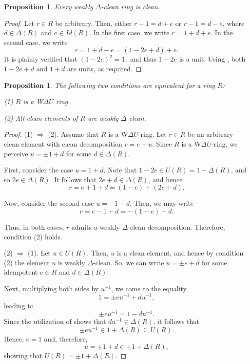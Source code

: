 \documentclass[12pt]{amsart}
\newtheorem{proposition}[theorem]{Proposition}
\theoremstyle{definition}
\begin{document}
\begin{proposition}\label{8}
Every weakly $\Delta$-clean ring is clean.
\end{proposition}

\begin{proof}
Let \( r \in R \) be arbitrary. Then, either \( r - 1 = d + e \) or \( r - 1 = d - e \), where \( d \in \Delta(R) \) and \( e \in Id(R) \). In the first case, we write
$
r = 1 + d + e.
$
In the second case, we write
\[
r = 1 + d - e = (1 - 2e + d) + e.
\]
It is plainly verified that
$
(1 - 2e)^2 = 1,
$
and thus \( 1 - 2e \) is a unit. Using \cite[Lemma 2.1]{Dj}, both \( 1 - 2e + d \) and \( 1 + d \) are units, as required.
\end{proof}

\begin{proposition}\label{6}
The following two conditions are equivalent for a ring \( R \):

(1) \( R \) is a W\( \Delta U \) ring.

(2) All clean elements of \( R \) are weakly \( \Delta \)-clean.
\end{proposition}

\begin{proof}
(1) $\Rightarrow$ (2). Assume that \( R \) is a W\( \Delta U \)-ring. Let \( r \in R \) be an arbitrary clean element with clean decomposition \( r = e + u \). Since \( R \) is a W\( \Delta U \)-ring, we perceive \( u = \pm 1 + d \) for some \( d \in \Delta(R) \).

First, consider the case \( u = 1 + d \). Note that \( 1 - 2e \in U(R) = 1 + \Delta(R) \), and so \( 2e \in \Delta(R) \). It follows that \( 2e + d \in \Delta(R) \), and hence
\[
r = e + 1 + d = (1 - e) + (2e + d).
\]

Now, consider the second case \( u = -1 + d \). Then, we may write
\[
r = e - 1 + d = -(1 - e) + d.
\]

Thus, in both cases, \( r \) admits a weakly \( \Delta \)-clean decomposition. Therefore, condition (2) holds.

(2) $\Rightarrow$ (1). Let \( u \in U(R) \). Then, \( u \) is a clean element, and hence by condition (2) the element \( u \) is weakly \( \Delta \)-clean. So, we can write \( u = \pm e + d \) for some idempotent \( e \in R \) and \( d \in \Delta(R) \).

Next, multiplying both sides by \( u^{-1} \), we come to the equality
\[
1 = \pm eu^{-1} + du^{-1},
\]
leading to
\[
\pm eu^{-1} = 1 - du^{-1}.
\]
Since the utilization of \cite[Lemma 1]{2} shows that \( du^{-1} \in \Delta(R) \), it follows that \[ \pm eu^{-1} \in 1 + \Delta(R) \subseteq U(R) .\] Hence, \( e = 1 \) and, therefore,
\[
u = \pm1 + d \in \pm1 + \Delta(R),
\]
showing that \( U(R) = \pm1 + \Delta(R) \).
\end{proof}
\end{document}
